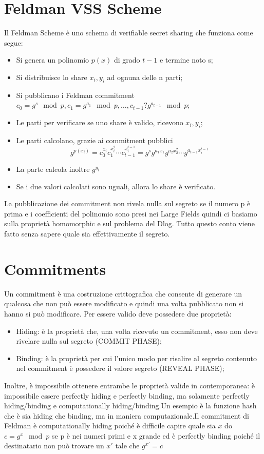 \documentclass{book}
\begin{document}
\section{Feldman VSS Scheme}
Il Feldman Scheme è uno schema di verifiable secret sharing che funziona come segue:\begin{itemize}
    \item Si genera un polinomio \(p(x)\) di grado \(t-1\) e termine noto s;
    \item Si distribuisce lo share \(x_{i},y_{i}\) ad ognuna delle n parti;
    \item Si pubblicano i Feldman commitment \(c_{0}=g^{s}\mod{p},c_{1}=g^{a_{1}}\mod{p},\ldots,c_{t-1}?g^{a_{t-1}}\mod{p}\);
    \item Le parti per verificare se uno share è valido, ricevono \(x_{i},y_{i}\);
    \item Le parti calcolano, grazie ai commitment pubblici\begin{equation*}
        g^{p(x_{i})}=c_{0}^{x_{i}}c_{1}^{x_{i}^{2}}\cdots c_{t-1}^{x_{i}^{t-1}}=g^{s}g^{a_{1}x_{1}}g^{a_{2}x_{2}^{2}}\cdots g^{a_{t-1}x_{i}^{t-1}}
    \end{equation*}
    \item La parte calcola inoltre \(g^{y_{i}}\)
    \item Se i due valori calcolati sono uguali, allora lo share è verificato.
\end{itemize}
La pubblicazione dei commitment non rivela nulla sul segreto se il numero p è prima e i coefficienti del polinomio sono presi nei Large Fields quindi ci basiamo sulla proprietà homomorphic e sul problema del Dlog. Tutto questo conto viene fatto senza sapere quale sia effettivamente il segreto.
\section{Commitments}
Un commitment è una costruzione crittografica che consente di generare un qualcosa che non può essere modificato e quindi una volta pubblicato non si hanno si può modificare. Per essere valido deve possedere due proprietà:\begin{itemize}
    \item Hiding: è la proprietà che, una volta ricevuto un commitment, esso non deve rivelare nulla sul segreto (COMMIT PHASE);
    \item Binding: è la proprietà per cui l'unico modo per risalire al segreto contenuto nel commitment è possedere il valore segreto (REVEAL PHASE);
\end{itemize}
Inoltre, è impossibile ottenere entrambe le proprietà valide in contemporanea: è impossibile essere perfectly hiding e perfectly binding, ma solamente perfectly hiding/binding e computationally hiding/binding.Un esempio è la funzione hash che è sia hiding che binding, ma in maniera computazionale.Il commitment di Feldman è computationally hiding poiché è difficile capire quale sia \(x\) do \(c=g^{x}\mod{p}\) se p è nei numeri primi e x grande ed è perfectly binding poiché il destinatario non può trovare un \(x'\) tale che \(g^{x'}=c\)
\end{document}
